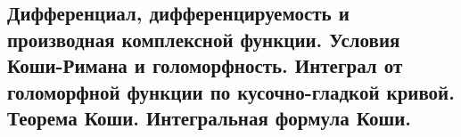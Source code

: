 \subsection{Дифференциал, дифференцируемость и производная комплексной функции. Условия Коши-Римана и голоморфность. Интеграл от голоморфной функции по кусочно-гладкой кривой. Теорема Коши. Интегральная формула Коши.}